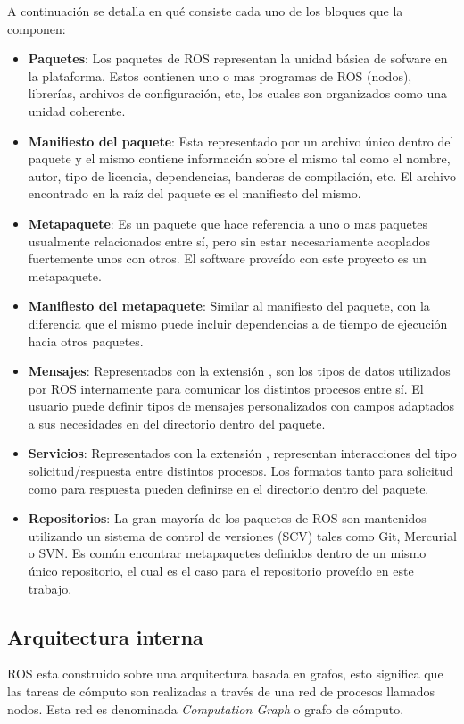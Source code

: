 \newpage
A continuación se detalla en qué consiste cada uno de los bloques que la componen:
\begin{itemize}
    \item \textbf{Paquetes}: Los paquetes de ROS representan la unidad básica de sofware en la plataforma. Estos contienen uno o mas programas de ROS (nodos), librerías, archivos de configuración, etc, los cuales son organizados como una unidad coherente.
    \item \textbf{Manifiesto del paquete}: Esta representado por un archivo único dentro del paquete y el mismo contiene información sobre el mismo tal como el nombre, autor, tipo de licencia, dependencias, banderas de compilación, etc. El archivo  encontrado en la raíz del paquete es el manifiesto del mismo.
    \item \textbf{Metapaquete}: Es un paquete que hace referencia a uno o mas paquetes usualmente relacionados entre sí, pero sin estar necesariamente acoplados fuertemente unos con otros. El software proveído con este proyecto es un metapaquete.
    \item \textbf{Manifiesto del metapaquete}: Similar al manifiesto del paquete, con la diferencia que el mismo puede incluir dependencias a de tiempo de ejecución hacia otros paquetes.
    \item \textbf{Mensajes}: Representados con la extensión , son los tipos de datos utilizados por ROS internamente para comunicar los distintos procesos entre sí. El usuario puede definir tipos de mensajes personalizados con campos adaptados a sus necesidades en del directorio  dentro del paquete.
    \item  \textbf{Servicios}: Representados con la extensión , representan interacciones del tipo solicitud/respuesta entre distintos procesos. Los formatos tanto para solicitud como para respuesta pueden definirse en el directorio  dentro del paquete.
    \item \textbf{Repositorios}: La gran mayoría de los paquetes de ROS son mantenidos utilizando un sistema de control de versiones (SCV) tales como Git, Mercurial o SVN. Es común encontrar metapaquetes definidos dentro de un mismo único repositorio, el cual es el caso para el repositorio proveído en este trabajo.
\end{itemize}

\subsection{Arquitectura interna}
ROS esta construido sobre una arquitectura basada en grafos, esto significa que las tareas de cómputo son realizadas a través de una red de procesos llamados nodos. Esta red es denominada \textit{Computation Graph} o grafo de cómputo.

